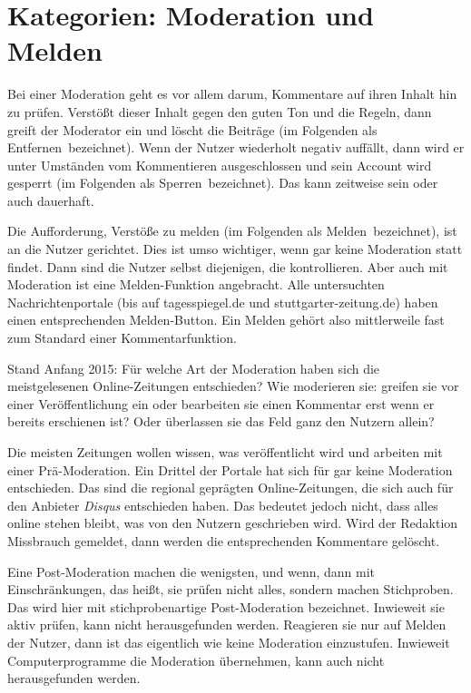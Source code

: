 \section{Kategorien: \glqq Moderation\grqq\- und \glqq Melden\grqq}

Bei einer Moderation geht es vor allem darum, Kommentare auf ihren Inhalt hin zu
prüfen. Verstößt dieser Inhalt gegen den guten Ton und die Regeln, dann greift
der Moderator ein und löscht die Beiträge (im Folgenden als \glqq
Entfernen\grqq\ bezeichnet). Wenn der Nutzer wiederholt negativ auffällt, dann
wird er unter Umständen vom Kommentieren ausgeschlossen und sein Account wird
gesperrt (im Folgenden als  \glqq Sperren\grqq\ bezeichnet). Das kann zeitweise
sein oder auch dauerhaft.

Die Aufforderung, Verstöße zu melden (im Folgenden als \glqq Melden\grqq\
bezeichnet), ist an die Nutzer gerichtet. Dies ist umso wichtiger, wenn gar
keine Moderation statt findet. Dann sind die Nutzer selbst diejenigen, die
kontrollieren. Aber auch mit Moderation ist eine Melden-Funktion angebracht.
Alle  untersuchten Nachrichtenportale (bis auf tagesspiegel.de und stuttgarter-zeitung.de) haben einen
entsprechenden Melden-Button. Ein \glqq Melden\grqq\- gehört also 
mittlerweile fast zum Standard einer Kommentarfunktion. 

Stand Anfang 2015: Für welche Art der Moderation haben sich die meistgelesenen
Online-Zeitungen entschieden? Wie moderieren sie: greifen sie vor einer
Veröffentlichung ein oder bearbeiten sie einen Kommentar erst wenn er bereits
erschienen ist? Oder überlassen sie das Feld ganz den Nutzern allein?

Die meisten Zeitungen wollen wissen, was veröffentlicht wird und arbeiten mit
einer Prä-Moderation.  Ein Drittel der Portale hat sich für gar keine Moderation
entschieden. Das sind die regional geprägten Online-Zeitungen, die sich auch für
den Anbieter {\slshape Disqus} entschieden haben. Das bedeutet jedoch nicht,
dass alles online stehen bleibt, was von den Nutzern geschrieben wird.  Wird der
Redaktion Missbrauch gemeldet, dann werden die entsprechenden Kommentare
gelöscht.

Eine Post-Moderation machen die wenigsten, und wenn, dann mit Einschränkungen,
das heißt, sie prüfen nicht alles, sondern machen Stichproben. Das wird hier mit
\glqq stichprobenartige Post-Moderation\grqq{} bezeichnet. Inwieweit sie aktiv
prüfen, kann nicht herausgefunden werden. Reagieren sie nur auf Melden der
Nutzer, dann ist das eigentlich wie \glqq keine Moderation\grqq{} einzustufen.
Inwieweit Computerprogramme die Moderation übernehmen, kann auch nicht
herausgefunden werden.

